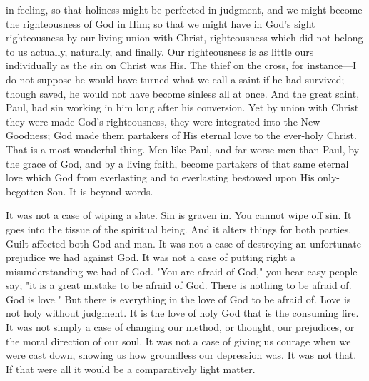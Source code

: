 \documentclass[12pt,a5paper,twoside,titlepage]{book}
\begin{document}
in feeling, so that holiness might be perfected in 
judgment, and we might become the righteousness 
of God in Him; so that we might have 
in God's sight righteousness by our living 
union with Christ, righteousness which did 
not belong to us actually, naturally, and 
finally. Our righteousness is as little ours individually 
as the sin on Christ was His. The 
thief on the cross, for instance---I do not suppose 
he would have turned what we call a saint 
if he had survived; though saved, he would 
not have become sinless all at once. And the 
great saint, Paul, had sin working in him long 
after his conversion. Yet by union with Christ 
they were made God's righteousness, they were 
integrated into the New Goodness; God made 
them partakers of His eternal love to the ever-holy 
Christ. That is a most wonderful thing. 
Men like Paul, and far worse men than Paul, 
by the grace of God, and by a living faith, 
become partakers of that same eternal love 
which God from everlasting and to everlasting 
bestowed upon His only-begotten Son. It is 
beyond words. 

It was not a case of wiping a slate. Sin 
is graven in. You cannot wipe off sin. It 
goes into the tissue of the spiritual being. And 
it alters things for both parties. Guilt affected 
both God and man. It was not a case of destroying 
an unfortunate prejudice we had 
against God. It was not a case of putting 
right a misunderstanding we had of God. 
"You are afraid of God," you hear easy people 
say; "it is a great mistake to be afraid of 
God. There is nothing to be afraid of. God is 
love." But there is everything in the love of 
God to be afraid of. Love is not holy without 
judgment. It is the love of holy God that 
is the consuming fire. It was not simply a 
case of changing our method, or thought, our 
prejudices, or the moral direction of our soul. 
It was not a case of giving us courage when we 
were cast down, showing us how groundless 
our depression was. It was not that. If that 
were all it would be a comparatively light 
matter. 
\end{document}
